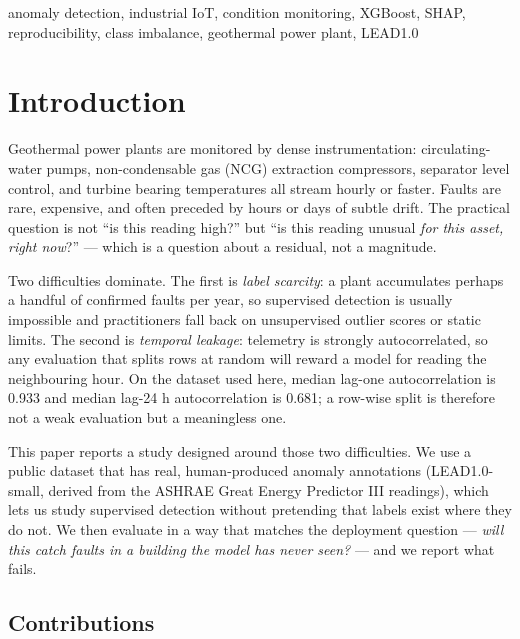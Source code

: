 \documentclass[conference]{IEEEtran}
\begin{document}
\begin{IEEEkeywords}
anomaly detection, industrial IoT, condition monitoring, XGBoost, SHAP, reproducibility,
class imbalance, geothermal power plant, LEAD1.0
\end{IEEEkeywords}

\section{Introduction}

Geothermal power plants are monitored by dense instrumentation: circulating-water pumps, non-condensable
gas (NCG) extraction compressors, separator level control, and turbine bearing temperatures all stream
hourly or faster. Faults are rare, expensive, and often preceded by hours or days of subtle drift.
The practical question is not ``is this reading high?'' but ``is this reading unusual \emph{for this
asset, right now}?'' --- which is a question about a residual, not a magnitude.

Two difficulties dominate. The first is \emph{label scarcity}: a plant accumulates perhaps a handful of
confirmed faults per year, so supervised detection is usually impossible and practitioners fall back on
unsupervised outlier scores or static limits. The second is \emph{temporal leakage}: telemetry is
strongly autocorrelated, so any evaluation that splits rows at random will reward a model for reading
the neighbouring hour. On the dataset used here, median lag-one autocorrelation is 0.933 and median
lag-24 h autocorrelation is 0.681; a row-wise split is therefore not a weak evaluation but a
meaningless one.

This paper reports a study designed around those two difficulties. We use a public dataset that has
real, human-produced anomaly annotations (LEAD1.0-small, derived from the ASHRAE Great Energy
Predictor III readings), which lets us study supervised detection without pretending that labels exist
where they do not. We then evaluate in a way that matches the deployment question --- \emph{will this
catch faults in a building the model has never seen?} --- and we report what fails.

\subsection*{Contributions}
\end{document}
